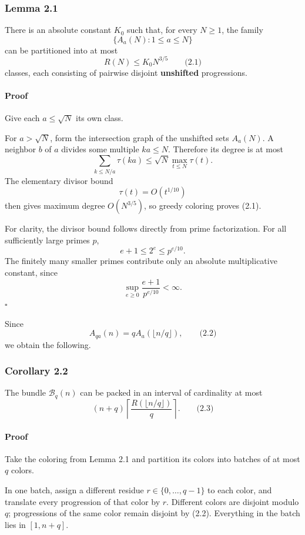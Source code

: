 \documentclass[
  11pt,
  a4paper,
]{article}
\begin{document}
\subsubsection{Lemma 2.1}\label{lemma-2.1}

There is an absolute constant \(K_0\) such that, for every \(N\ge1\),
the family \[
\{A_a(N):1\le a\le N\}
\] can be partitioned into at most \[
R(N)\le K_0N^{3/5}
\qquad\text{(2.1)}
\] classes, each consisting of pairwise disjoint \textbf{unshifted}
progressions.

\paragraph{Proof}\label{proof}

Give each \(a\le\sqrt N\) its own class.

For \(a>\sqrt N\), form the intersection graph of the unshifted sets
\(A_a(N)\). A neighbor \(b\) of \(a\) divides some multiple \(ka\le N\).
Therefore its degree is at most \[
\sum_{k\le N/a}\tau(ka)
\le \sqrt N\max_{t\le N}\tau(t).
\] The elementary divisor bound \[
\tau(t)=O(t^{1/10})
\] then gives maximum degree \(O(N^{3/5})\), so greedy coloring proves
(2.1).

For clarity, the divisor bound follows directly from prime
factorization. For all sufficiently large primes \(p\), \[
e+1\le 2^e\le p^{e/10}.
\] The finitely many smaller primes contribute only an absolute
multiplicative constant, since \[
\sup_{e\ge0}\frac{e+1}{p^{e/10}}<\infty.
\] \(\square\)

Since \[
A_{qa}(n)=qA_a(\lfloor n/q\rfloor),
\qquad\text{(2.2)}
\] we obtain the following.

\subsubsection{Corollary 2.2}\label{corollary-2.2}

The bundle \(\mathcal B_q(n)\) can be packed in an interval of
cardinality at most \[
(n+q)\left\lceil\frac{R(\lfloor n/q\rfloor)}q\right\rceil.
\qquad\text{(2.3)}
\]

\paragraph{Proof}\label{proof-1}

Take the coloring from Lemma 2.1 and partition its colors into batches
of at most \(q\) colors.

In one batch, assign a different residue \(r\in\{0,\ldots,q-1\}\) to
each color, and translate every progression of that color by \(r\).
Different colors are disjoint modulo \(q\); progressions of the same
color remain disjoint by (2.2). Everything in the batch lies in
\([1,n+q]\).
\end{document}
